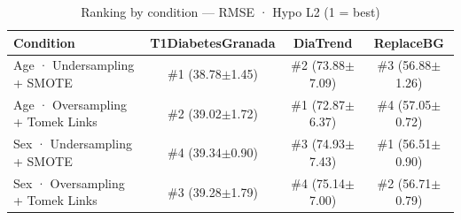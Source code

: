 \begin{table}[htbp]
\centering
\small
\caption{Ranking by condition — RMSE · Hypo L2  (1 = best)}
\label{tab:ranking_rmse_tbr_2_family_mechanism_random+guided}
\begin{tabular}{lccc}
\toprule
\textbf{Condition} & \textbf{T1DiabetesGranada} & \textbf{DiaTrend} & \textbf{ReplaceBG} \\
\midrule
Age · Undersampling + SMOTE & \#1 (38.78$\pm$1.45) & \#2 (73.88$\pm$7.09) & \#3 (56.88$\pm$1.26) \\
Age · Oversampling + Tomek Links & \#2 (39.02$\pm$1.72) & \#1 (72.87$\pm$6.37) & \#4 (57.05$\pm$0.72) \\
\midrule
Sex · Undersampling + SMOTE & \#4 (39.34$\pm$0.90) & \#3 (74.93$\pm$7.43) & \#1 (56.51$\pm$0.90) \\
Sex · Oversampling + Tomek Links & \#3 (39.28$\pm$1.79) & \#4 (75.14$\pm$7.00) & \#2 (56.71$\pm$0.79) \\
\bottomrule
\end{tabular}
\end{table}